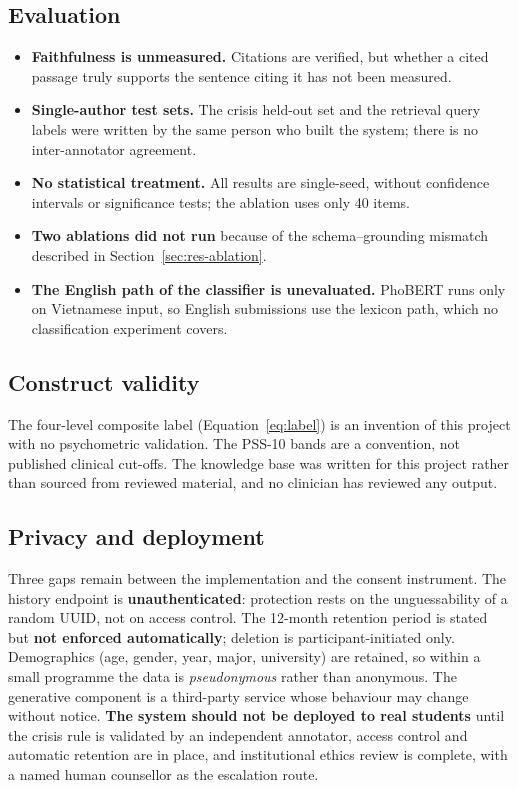 \subsection{Evaluation}
\begin{itemize}
	\item \textbf{Faithfulness is unmeasured.} Citations are verified, but whether a cited passage truly supports the sentence citing it has not been measured.
	\item \textbf{Single-author test sets.} The crisis held-out set and the retrieval query labels were written by the same person who built the system; there is no inter-annotator agreement.
	\item \textbf{No statistical treatment.} All results are single-seed, without confidence intervals or significance tests; the ablation uses only 40 items.
	\item \textbf{Two ablations did not run} because of the schema--grounding mismatch described in Section~\ref{sec:res-ablation}.
	\item \textbf{The English path of the classifier is unevaluated.} PhoBERT runs only on Vietnamese input, so English submissions use the lexicon path, which no classification experiment covers.
\end{itemize}

\subsection{Construct validity}
The four-level composite label (Equation~\eqref{eq:label}) is an invention of this project with no psychometric validation. The PSS-10 bands are a convention, not published clinical cut-offs. The knowledge base was written for this project rather than sourced from reviewed material, and no clinician has reviewed any output.

\subsection{Privacy and deployment}
Three gaps remain between the implementation and the consent instrument. The history endpoint is \textbf{unauthenticated}: protection rests on the unguessability of a random UUID, not on access control. The 12-month retention period is stated but \textbf{not enforced automatically}; deletion is participant-initiated only. Demographics (age, gender, year, major, university) are retained, so within a small programme the data is \textit{pseudonymous} rather than anonymous. The generative component is a third-party service whose behaviour may change without notice. \textbf{The system should not be deployed to real students} until the crisis rule is validated by an independent annotator, access control and automatic retention are in place, and institutional ethics review is complete, with a named human counsellor as the escalation route.

